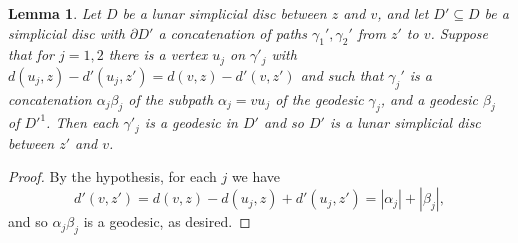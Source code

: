 \documentclass[a4paper,12pt,leqno]{amsart}
\newtheorem{lemma}[thm]{Lemma}
\theoremstyle{definition}
\begin{document}
\begin{lemma}
\label{lem:geodesic}
Let $D$ be a lunar simplicial disc between $z$ and $v$, and let $D'\subseteq D$ be 
a simplicial disc with $\partial D'$ a concatenation of paths $\gamma_1',\gamma_2'$ from $z'$ to $v$. Suppose that for $j=1,2$ there is a vertex $u_j$ on $\gamma'_j$ with $d(u_j,z)-d'(u_j,z')=d(v,z)-d'(v,z')$ and such that $\gamma_j'$ is a concatenation $\alpha_j\beta_j$ of the subpath $\alpha_j=vu_j$ of the geodesic $\gamma_j$, and a geodesic $\beta_j$ of $D'^1$. Then each $\gamma'_j$ is a geodesic in $D'$ and so $D'$ is a lunar simplicial disc between $z'$ and $v$.  
\end{lemma}
\begin{proof}
By the hypothesis, for each $j$ we have $$d'(v,z')=d(v,z)-d(u_j,z)+d'(u_j,z')=|\alpha_j|+|\beta_j|,$$ and so $\alpha_j\beta_j$ is a geodesic, as desired.
\end{proof}
\end{document}
